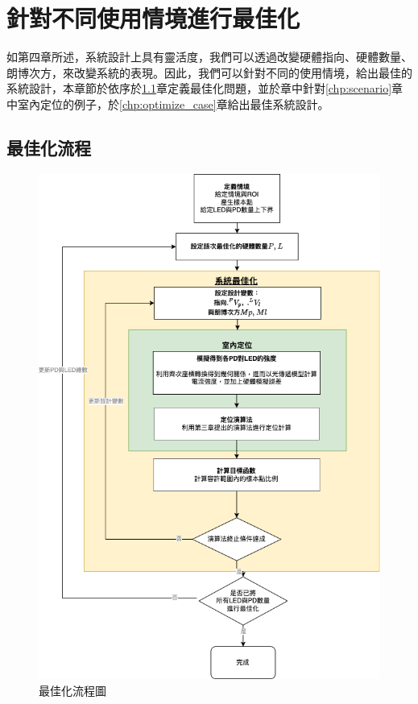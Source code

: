 \chapter{針對不同使用情境進行最佳化}
\label{chp:5}



如第四章所述，系統設計上具有靈活度，我們可以透過改變硬體指向、硬體數量、朗博次方，來改變系統的表現。因此，我們可以針對不同的使用情境，給出最佳的系統設計，本章節於依序於\ref{chp:optimize}章定義最佳化問題，並於章中針對\ref{chp:scenario}章中室內定位的例子，於\ref{chp:optimize_case}章給出最佳系統設計。








\section{最佳化流程}
\label{chp:optimize}

\begin{figure}[h!]
    \centering
    \includegraphics[width=13cm]{ch5pic/optimize_flow.png}
    \caption{最佳化流程圖}
    \label{pic:optimize_flow}
\end{figure}

